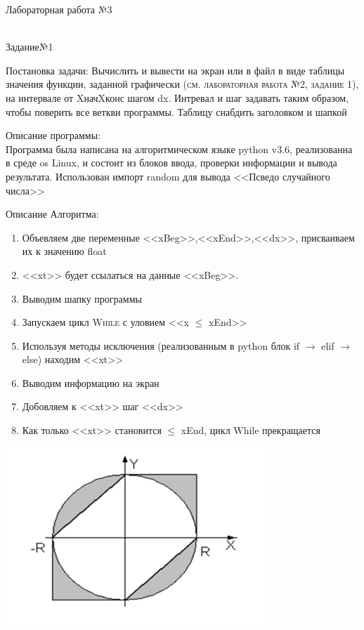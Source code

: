 \documentclass[a4paper]{article}
\begin{document}
\newpage
Лабораторная работа №3
\\
    \begin{lab3.1}
        \begin{center}\underline{\hspace{6cm}}\\
            Задание№1\\
        \end{center}
        Постановка задачи:\hspace{5mm} Вычислить и вывести на экран или в файл в виде таблицы значения функции, заданной графически \textsc{(см. лабораторная работа №2, задание 1)}, на интервале от X\small{нач} X\small{кон}\normalsize с шагом dx. Интревал и шаг задавать таким образом, чтобы поверить все веткви программы. Таблицу снабдить заголовком и  шапкой
    \begin{description}
        Описание программы:\\
        Программа была написана на алгоритмическом языке python v3.6, реализованна в среде os Linux, и состоит из блоков ввода, проверки информации и вывода результата. Использован импорт random для вывода <<Псведо случайного числа>>
    \end{description}
    \begin{algoritm}
        Описание Алгоритма:
        \small\begin{enumerate}
            \item Объевляем две переменные <<xBeg>>,<<xEnd>>,<<dx>>, присваиваем их к значению float
            \item <<xt>> будет ссылаться на данные <<xBeg>>.
            \item Выводим шапку программы
            \item Запускаем цикл \textsc{While} с уловием <<x $\leq$ xEnd>>
            \item Используя методы исключения (реализованным в python блок if $\to$ elif $\to$ else) находим <<xt>>
            \item Выводим информацию на экран
            \item Добовляем к <<xt>> шаг <<dx>>
            \item Как только <<xt>> становится $\leq$ xEnd, цикл While прекращается
        \end{enumerate}
    \begin{center}
        \includegraphics[width=100mm,scale=0.5]{for_lab_2_last.png}

\end{center}
\end{algoritm}
\end{lab3.1}
\end{document}
